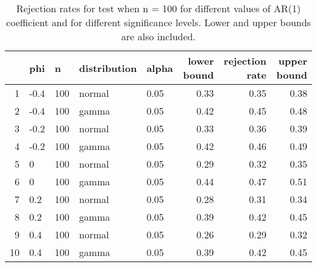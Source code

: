 \begin{table}[ht]
\centering
\caption{Rejection rates for test when n = 100 for 
                   different values of AR(1) coefficient and for different 
                   significance levels. Lower and upper bounds are also 
                   included.} 
\label{table:rr_100}
\begin{tabular}{rllllrrr}
  \hline
 & phi & n & distribution & alpha & lower bound & rejection rate & upper bound \\ 
  \hline
1 & -0.4 & 100 & normal & 0.05 & 0.33 & 0.35 & 0.38 \\ 
  2 & -0.4 & 100 & gamma & 0.05 & 0.42 & 0.45 & 0.48 \\ 
  3 & -0.2 & 100 & normal & 0.05 & 0.33 & 0.36 & 0.39 \\ 
  4 & -0.2 & 100 & gamma & 0.05 & 0.42 & 0.46 & 0.49 \\ 
  5 & 0 & 100 & normal & 0.05 & 0.29 & 0.32 & 0.35 \\ 
  6 & 0 & 100 & gamma & 0.05 & 0.44 & 0.47 & 0.51 \\ 
  7 & 0.2 & 100 & normal & 0.05 & 0.28 & 0.31 & 0.34 \\ 
  8 & 0.2 & 100 & gamma & 0.05 & 0.39 & 0.42 & 0.45 \\ 
  9 & 0.4 & 100 & normal & 0.05 & 0.26 & 0.29 & 0.32 \\ 
  10 & 0.4 & 100 & gamma & 0.05 & 0.39 & 0.42 & 0.45 \\ 
   \hline
\end{tabular}
\end{table}

